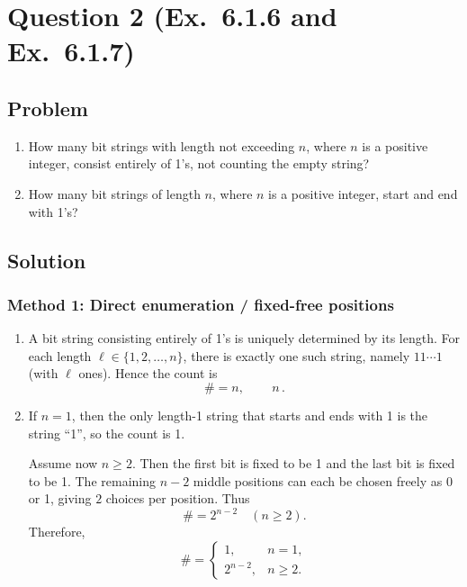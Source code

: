 \documentclass[12pt]{article}
\begin{document}

\newpage
\section{Question 2 (Ex.\ 6.1.6 and Ex.\ 6.1.7)}
\subsection{Problem}
\begin{enumerate}[label=(\alph*)]
\item How many bit strings with length not exceeding $n$, where $n$ is a positive integer, consist entirely of 1's, not counting the empty string?
\item How many bit strings of length $n$, where $n$ is a positive integer, start and end with 1's?
\end{enumerate}

\subsection{Solution}

\subsubsection{Method 1: Direct enumeration / fixed-free positions}
\begin{enumerate}[label=(\alph*)]
\item A bit string consisting entirely of 1's is uniquely determined by its length.
For each length $\ell\in\{1,2,\dots,n\}$, there is exactly one such string, namely $11\cdots 1$ (with $\ell$ ones).
Hence the count is
\[
\# = n,
\qquad
\boxed{\,n\,}.
\]

\item If $n=1$, then the only length-1 string that starts and ends with 1 is the string ``1'', so the count is 1.

Assume now $n\ge 2$. Then the first bit is fixed to be 1 and the last bit is fixed to be 1. The remaining $n-2$ middle positions can each be chosen freely as 0 or 1, giving $2$ choices per position. Thus
\[
\# = 2^{n-2}\quad (n\ge 2).
\]
Therefore,
\[
\boxed{\,
\#=
\begin{cases}
1, & n=1,\\
2^{n-2}, & n\ge 2.
\end{cases}
\,}
\]
\end{enumerate}
\end{document}
